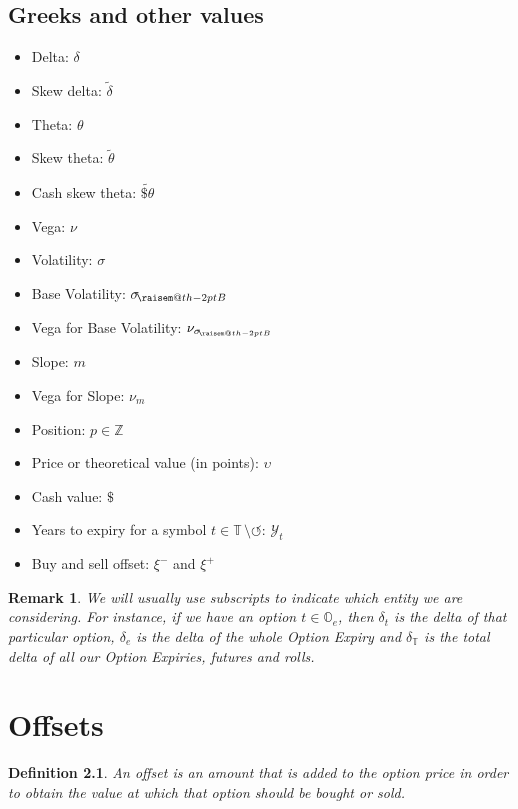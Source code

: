 \documentclass[10pt, a4paper, oneside]{article}
\makeatletter
\newcommand{\Z}{\ensuremath{\mathbb{Z}}}
\newtheorem*{remark}{Remark}
\newtheorem*{definition}{Definition}
\newcommand{\raisemath}[1]{\mathpalette{\raisem@th{#1}}}
\newcommand{\raisem@th}[3]{\raisebox{#1}{$#2#3$}}
\newcommand{\options}{\ensuremath{\mathbb{O}}}
\newcommand{\rolls}{\ensuremath{\circlearrowleft}}
\newcommand{\total}{\ensuremath{\mathbb{T}}}
\newcommand{\sdelta}{\ensuremath{\tilde{\delta}}}
\newcommand{\stheta}{\ensuremath{\tilde{\theta}}}
\newcommand{\cstheta}{\ensuremath{\widetilde{\cash\theta}}}
\newcommand{\vega}{\ensuremath{\nu}}
\newcommand{\volatility}{\ensuremath{\sigma}}
\newcommand{\basevol}{\ensuremath{{\volatility_{\!\raisemath{-2pt}{B}}}}}
\newcommand{\vegabv}{\ensuremath{{\vega_\basevol}}}
\newcommand{\slope}{\ensuremath{m}}
\newcommand{\vegaslo}{\ensuremath{{\vega_\slope}}}
\newcommand{\pos}{\ensuremath{p}}
\newcommand{\price}{\ensuremath{\upsilon}}
\newcommand{\yte}{\ensuremath{\mathcal{Y}}}
\newcommand{\cash}{\ensuremath{\mathdollar}}
\makeatother
\begin{document}
\section{Greeks and other values}
\begin{itemize}
  \item Delta: $\delta$
  \item Skew delta: $\sdelta$
  \item Theta: $\theta$
  \item Skew theta: $\stheta$
  \item Cash skew theta: $\cstheta$
  \item Vega: $\vega$
  \item Volatility: $\sigma$
  \item Base Volatility: $\basevol$
  \item Vega for Base Volatility: $\vegabv$
  \item Slope: $\slope$
  \item Vega for Slope: $\vegaslo$
  \item Position: $\pos \in \Z$
  \item Price or theoretical value (in points): $\price$
  \item Cash value: $\cash$
  \item Years to expiry for a symbol $t \in \total\,\setminus\!\rolls$: $\yte_t$
  \item Buy and sell offset: $\xi^-$ and $\xi^+$
\end{itemize}

\begin{remark}
We will usually use subscripts to indicate which entity we are considering. For instance, if we have an option $t \in \options_e$, then $\delta_t$ is the delta of that particular option,
$\delta_e$ is the delta of the whole Option Expiry and $\delta_\total$ is the total delta of all our Option Expiries, futures and rolls.
\end{remark}



\chapter{Offsets}
\begin{definition} An \emph{offset} is an amount that is added to the option price in order to obtain the value at which that option should be bought or sold. \end{definition}
\end{document}
